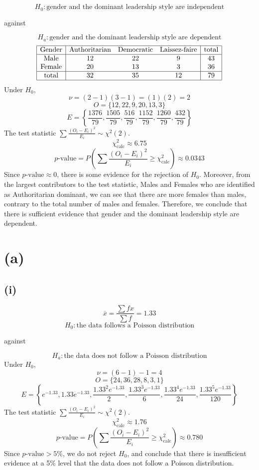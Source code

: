 \documentclass[a4paper]{article}
\newcommand{\pp}{p\text{-value}}
\begin{document}
\section{}
\[H_0:\text{gender and the dominant leadership style are independent}\]
\begin{center}against\end{center}
\[H_a:\text{gender and the dominant leadership style are dependent}\]
\[\begin{array}{|c|ccc|c|}
    \hline
    \text{Gender}   &\text{Authoritarian}   &\text{Democratic}  &\text{Laissez-faire}   &\text{total}\\
    \hline
    \text{Male}     &12                     &22                 &9                      &43\\
    \text{Female}   &20                     &13                 &3                      &36\\
    \hline
    \text{total}    &32                     &35                 &12                     &79\\
    \hline
\end{array}\]
Under \(H_0\),
\[\nu=(2-1)(3-1)=(1)(2)=2\]
\[O=\{12,22,9,20,13,3\}\]
\[E=\left\{\frac{1376}{79},\frac{1505}{79},\frac{516}{79},\frac{1152}{79},\frac{1260}{79},\frac{432}{79}\right\}\]
The test statistic \(\sum\frac{(O_i-E_i)^2}{E_i}\sim\chi^2(2)\).
\[\chi^2_\text{calc}\approx6.75\]
\[\pp=P\left(\sum\frac{(O_i-E_i)^2}{E_i}\geqslant\chi^2_\text{calc}\right)\approx0.0343\]
Since \(\pp\approx0\), there is some evidence for the rejection of \(H_0\). Moreover, from the largest contributors to the test statistic, Males and Females who are identified as Authoritarian dominant, we can see that there are more females than males, contrary to the total number of males and females. Therefore, we conclude that there is sufficient evidence that gender and the dominant leadership style are dependent.

\section{(a)}
\subsection*{(i)}
\[\bar x=\frac{\sum fx}{\sum f}=1.33\]
\[H_0:\text{the data follows a Poisson distribution}\]
\begin{center}against\end{center}
\[H_a:\text{the data does not follow a Poisson distribution}\]
Under \(H_0\),
\[\nu=(6-1)-1=4\]
\[O=\{24,36,28,8,3,1\}\]
\[E=\left\{e^{-1.33},1.33e^{-1.33},\frac{1.33^2e^{-1.33}}2,\frac{1.33^3e^{-1.33}}6,\frac{1.33^4e^{-1.33}}{24},\frac{1.33^5e^{-1.33}}{120}\right\}\]
The test statistic \(\sum\frac{(O_i-E_i)^2}{E_i}\sim\chi^2(2)\).
\[\chi^2_\text{calc}\approx1.76\]
\[\pp=P\left(\sum\frac{(O_i-E_i)^2}{E_i}\geqslant\chi^2_\text{calc}\right)\approx0.780\]
Since \(\pp>5\%\), we do not reject \(H_0\), and conclude that there is insufficient evidence at a 5\% level that the data does not follow a Poisson distribution.
\end{document}
